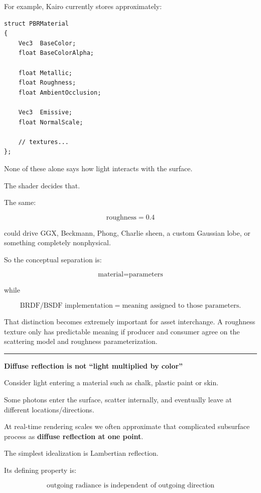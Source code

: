 For example, Kairo currently stores approximately:

\begin{verbatim}
struct PBRMaterial
{
    Vec3  BaseColor;
    float BaseColorAlpha;

    float Metallic;
    float Roughness;
    float AmbientOcclusion;

    Vec3  Emissive;
    float NormalScale;

    // textures...
};
\end{verbatim}

None of these alone says how light interacts with the surface.

The shader decides that.

The same:

\[
\text{roughness}=0.4
\]

could drive GGX, Beckmann, Phong, Charlie sheen, a custom Gaussian lobe, or something completely nonphysical.

So the conceptual separation is:

\[
\boxed{
\text{material}
=
\text{parameters}
}
\]

while

\[
\boxed{
\text{BRDF/BSDF implementation}
=
\text{meaning assigned to those parameters}.
}
\]

That distinction becomes extremely important for asset interchange. A roughness texture only has predictable meaning if producer and consumer agree on the scattering model and roughness parameterization.

\begin{center}\rule{0.5\linewidth}{0.5pt}\end{center}

\textbf{Diffuse reflection is not ``light multiplied by color''}

Consider light entering a material such as chalk, plastic paint or skin.

Some photons enter the surface, scatter internally, and eventually leave at different locations/directions.

At real-time rendering scales we often approximate that complicated subsurface process as \textbf{diffuse reflection at one point}.

The simplest idealization is Lambertian reflection.

Its defining property is:

\[
\boxed{
\text{outgoing radiance is independent of outgoing direction}
}
\]

